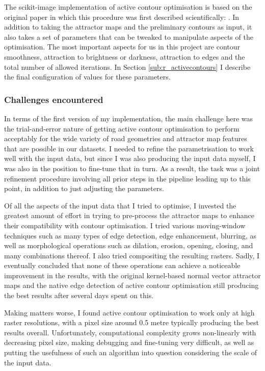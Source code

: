 The scikit-image implementation of active contour optimisation is based on the original paper in which this procedure was first described scientifically: \cite{kass_etal_1988}. In addition to taking the attractor maps and the preliminary contours as input, it also takes a set of parameters that can be tweaked to manipulate aspects of the optimisation. The most important aspects for us in this project are contour smoothness, attraction to brightness or darkness, attraction to edges and the total number of allowed iterations. In Section \ref{sub:r_activecontours} I describe the final configuration of values for these parameters.

\subsubsection{Challenges encountered}

In terms of the first version of my implementation, the main challenge here was the trial-and-error nature of getting active contour optimisation to perform acceptably for the wide variety of road geometries and attractor map features that are possible in our datasets. I needed to refine the parametrisation to work well with the input data, but since I was also producing the input data myself, I was also in the position to fine-tune that in turn. As a result, the task was a joint refinement procedure involving all prior steps in the pipeline leading up to this point, in addition to just adjusting the parameters.

Of all the aspects of the input data that I tried to optimise, I invested the greatest amount of effort in trying to pre-process the attractor maps to enhance their compatibility with contour optimisation. I tried various moving-window techniques such as many types of edge detection, edge enhancement, blurring, as well as morphological operations such as dilation, erosion, opening, closing, and many combinations thereof. I also tried compositing the resulting rasters. Sadly, I eventually concluded that none of these operations can achieve a noticeable improvement in the results, with the original kernel-based normal vector attractor maps and the native edge detection of active contour optimisation still producing the best results after several days spent on this.

Making matters worse, I found active contour optimisation to work only at high raster resolutions, with a pixel size around 0.5 metre typically producing the best results overall. Unfortunately, computational complexity grows non-linearly with decreasing pixel size, making debugging and fine-tuning very difficult, as well as putting the usefulness of such an algorithm into question considering the scale of the input data.

